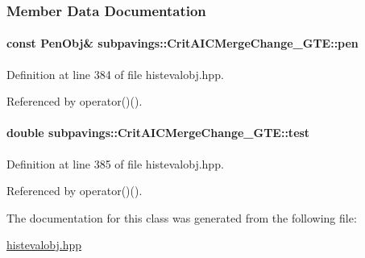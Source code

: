 \subsubsection{\-Member \-Data \-Documentation}
\hypertarget{classsubpavings_1_1CritAICMergeChange__GTE_a4e6ff8fc5fd0b8bfef238e5f48875e42}{
\paragraph[{pen}]{\setlength{\rightskip}{0pt plus 5cm}const {\bf \-Pen\-Obj}\& {\bf subpavings\-::\-Crit\-A\-I\-C\-Merge\-Change\-\_\-\-G\-T\-E\-::pen}}}\label{classsubpavings_1_1CritAICMergeChange__GTE_a4e6ff8fc5fd0b8bfef238e5f48875e42}


\-Definition at line 384 of file histevalobj.\-hpp.



\-Referenced by operator()().

\hypertarget{classsubpavings_1_1CritAICMergeChange__GTE_a6ddac11ad1ab2730eff435a1ebbb6c6b}{
\paragraph[{test}]{\setlength{\rightskip}{0pt plus 5cm}double {\bf subpavings\-::\-Crit\-A\-I\-C\-Merge\-Change\-\_\-\-G\-T\-E\-::test}}}\label{classsubpavings_1_1CritAICMergeChange__GTE_a6ddac11ad1ab2730eff435a1ebbb6c6b}


\-Definition at line 385 of file histevalobj.\-hpp.



\-Referenced by operator()().



\-The documentation for this class was generated from the following file\-:\begin{DoxyCompactItemize}
\item 
\hyperlink{histevalobj_8hpp}{histevalobj.\-hpp}\end{DoxyCompactItemize}
